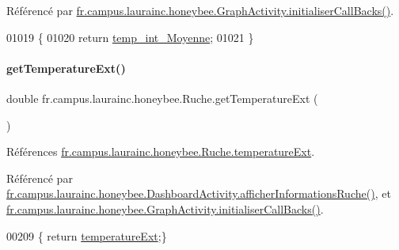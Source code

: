 Référencé par \hyperlink{classfr_1_1campus_1_1laurainc_1_1honeybee_1_1_graph_activity_a8dc56c3e0744bcb9295ad10e726b5fdb}{fr.\+campus.\+laurainc.\+honeybee.\+Graph\+Activity.\+initialiser\+Call\+Backs()}.


\begin{DoxyCode}
01019                                         \{
01020         \textcolor{keywordflow}{return} \hyperlink{classfr_1_1campus_1_1laurainc_1_1honeybee_1_1_ruche_a99bf4c97fe3710861e0a730cc0010bfb}{temp\_int\_Moyenne};
01021     \}
\end{DoxyCode}
\mbox{\label{classfr_1_1campus_1_1laurainc_1_1honeybee_1_1_ruche_ac42e5846fb470d9ac9112c20c8679980}} 
\paragraph{\texorpdfstring{get\+Temperature\+Ext()}{getTemperatureExt()}}
{\footnotesize\ttfamily double fr.\+campus.\+laurainc.\+honeybee.\+Ruche.\+get\+Temperature\+Ext (\begin{DoxyParamCaption}{ }\end{DoxyParamCaption})}



Références \hyperlink{classfr_1_1campus_1_1laurainc_1_1honeybee_1_1_ruche_aabdc13a8650aed77ee5497236e79174b}{fr.\+campus.\+laurainc.\+honeybee.\+Ruche.\+temperature\+Ext}.



Référencé par \hyperlink{classfr_1_1campus_1_1laurainc_1_1honeybee_1_1_dashboard_activity_a88f00531bee33bd6c47b33f5ac4df9ed}{fr.\+campus.\+laurainc.\+honeybee.\+Dashboard\+Activity.\+afficher\+Informations\+Ruche()}, et \hyperlink{classfr_1_1campus_1_1laurainc_1_1honeybee_1_1_graph_activity_a8dc56c3e0744bcb9295ad10e726b5fdb}{fr.\+campus.\+laurainc.\+honeybee.\+Graph\+Activity.\+initialiser\+Call\+Backs()}.


\begin{DoxyCode}
00209 \{ \textcolor{keywordflow}{return} \hyperlink{classfr_1_1campus_1_1laurainc_1_1honeybee_1_1_ruche_aabdc13a8650aed77ee5497236e79174b}{temperatureExt};\}
\end{DoxyCode}
\mbox{\label{classfr_1_1campus_1_1laurainc_1_1honeybee_1_1_ruche_aca5e489525d7f0cba7741a0d1803c5e5}} 
